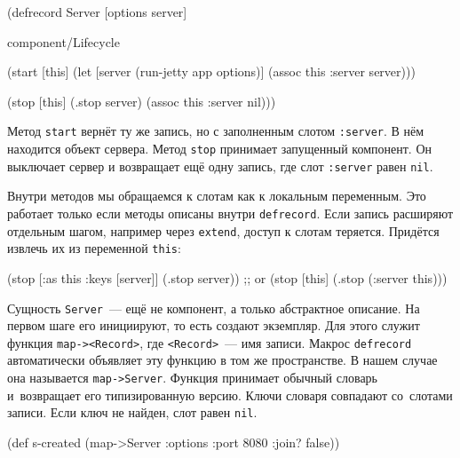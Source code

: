 \else

\begin{english}
  \begin{clojure}
(defrecord Server [options server]

  component/Lifecycle

  (start [this]
    (let [server (run-jetty app options)]
      (assoc this :server server)))

  (stop [this]
    (.stop server)
    (assoc this :server nil)))
  \end{clojure}
\end{english}

\fi

Метод \verb|start| вернёт ту же запись, но с заполненным слотом
\verb|:server|. В нём находится объект сервера. Метод \verb|stop| принимает
запущенный компонент. Он выключает сервер и возвращает ещё одну запись, где слот
\verb|:server| равен \verb|nil|.


Внутри методов мы обращаемся к слотам как к локальным переменным. Это работает
только если методы описаны внутри \verb|defrecord|. Если запись расширяют
отдельным шагом, например через \verb|extend|, доступ к слотам
теряется. Придётся извлечь их из переменной \verb|this|:

\begin{english}
  \begin{clojure}
(stop [{:as this :keys [server]}]
  (.stop server))
;; or
(stop [this]
  (.stop (:server this)))
  \end{clojure}
\end{english}

Сущность \verb|Server|~--- ещё не компонент, а только абстрактное описание. На
первом шаге его инициируют, то есть создают экземпляр. Для этого служит функция
\verb|map-><Record>|, где \verb|<Record>|~--- имя записи. Макрос
\verb|defrecord| автоматически объявляет эту функцию в том же пространстве. В
нашем случае она называется \verb|map->Server|. Функция принимает обычный
словарь и~возвращает его типизированную версию. Ключи словаря совпадают
со~слотами записи. Если ключ не найден, слот равен \verb|nil|.

\ifnarrow

\begin{english}
  \begin{clojure}
(def s-created
  (map->Server
    {:options {:port 8080
               :join? false}}))
  \end{clojure}
\end{english}

